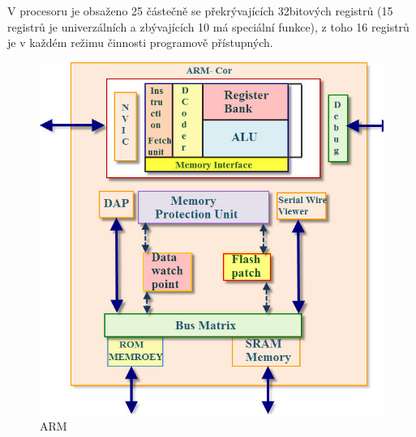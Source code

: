V procesoru je obsaženo 25 částečně se překrývajících 32bitových registrů (15 registrů je univerzálních a zbývajících 10 má speciální funkce), z toho 16 registrů je v každém režimu činnosti programově přístupných.
    \begin{figure}[h]
   \begin{center}
     \includegraphics[scale=0.5]{images/ARM.png}
   \end{center}
   \caption{ARM}
  \end{figure}















